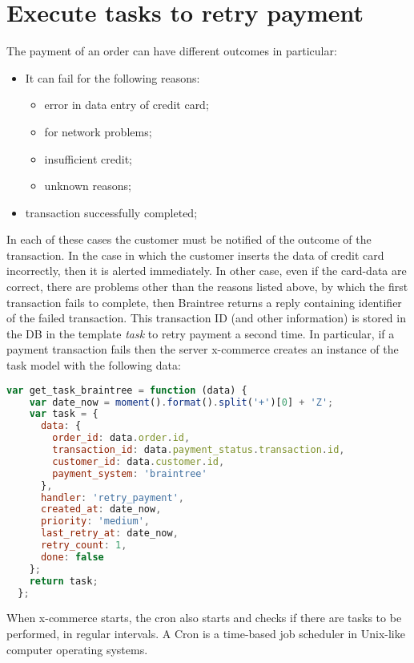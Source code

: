 \section{Execute tasks to retry payment}
\label{sec:tasks_to_retry_payment}
The payment of an order can have different outcomes in particular:
\begin{itemize}
\item It can fail for the following reasons:
\begin{itemize}
\item error in data entry of credit card;
\item for network problems;
\item insufficient credit;
\item unknown reasons;
\end{itemize}
\item transaction successfully completed;
\end{itemize}
In each of these cases the customer must be notified of the outcome of the transaction.
\newline
In the case in which the customer inserts the data of credit card incorrectly, then it is alerted immediately.
\newline
In other case, even if the card-data are correct, there are problems other than the reasons listed above, by which the first transaction fails to complete, then Braintree returns a reply containing identifier of the failed transaction.
\newline
This transaction ID (and other information) is stored in the DB in the template \emph{task} to retry payment a second time.
In particular, if a payment transaction fails then the server x-commerce creates an instance of the task model with the following data:
\begin{lstlisting}[language=javascript]
  var get_task_braintree = function (data) {
    var date_now = moment().format().split('+')[0] + 'Z';
    var task = {
      data: {
        order_id: data.order.id,
        transaction_id: data.payment_status.transaction.id,
        customer_id: data.customer.id,
        payment_system: 'braintree'
      },
      handler: 'retry_payment',
      created_at: date_now,
      priority: 'medium',
      last_retry_at: date_now,
      retry_count: 1,
      done: false
    };
    return task;
  };
\end{lstlisting}
When x-commerce starts, the cron also starts and checks if there are tasks to be performed, in regular intervals.
A Cron is a time-based job scheduler in Unix-like computer operating systems.

